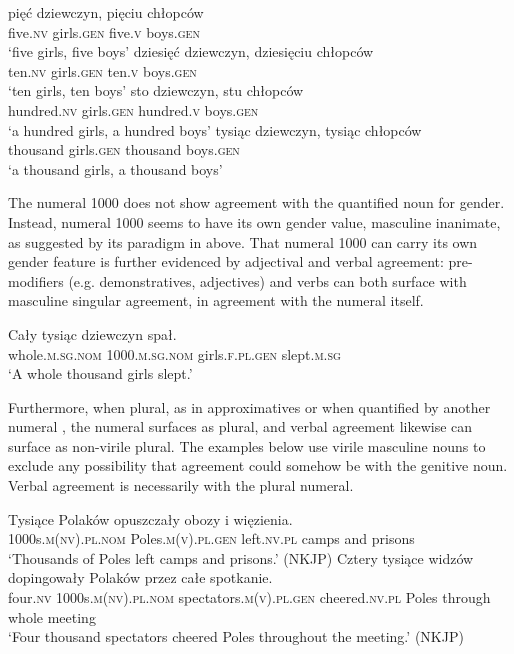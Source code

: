 \documentclass[output=paper]{langscibook}
\begin{document}
\ea \label{klo:ex:5,10,100,1000V.NV} \ea
\gll pięć dziewczyn, pięciu chłopców\\
five.\textsc{nv} girls.\textsc{gen} five.\textsc{v} boys.\textsc{gen}\\
\glt `five girls, five boys'
\ex \gll dziesięć dziewczyn, dziesięciu chłopców\\
ten.\textsc{nv} girls.\textsc{gen} ten.\textsc{v} boys.\textsc{gen}\\
\glt `ten girls, ten boys'
\ex \gll sto dziewczyn, stu chłopców\\
hundred.\textsc{nv} girls.\textsc{gen} hundred.\textsc{v} boys.\textsc{gen}\\
\glt `a hundred girls, a hundred boys'
\ex \gll tysiąc dziewczyn, tysiąc chłopców\\
thousand girls.\textsc{gen} thousand boys.\textsc{gen}\\
\glt `a thousand girls, a thousand boys'
\z \z %

\noindent The numeral 1000 does not show agreement with the quantified noun for gender. Instead, numeral 1000 seems to have its own gender value, masculine inanimate, as suggested by its paradigm in  above. That numeral 1000 can carry its own gender feature is further evidenced by adjectival and verbal agreement: pre-modifiers (e.g. demonstratives, adjectives) and verbs can both surface with masculine singular agreement, in agreement with the numeral itself.

\ea\label{klo:ex:sg1000}
\gll Cały tysiąc dziewczyn spał.\\
whole.\textsc{m.sg.nom} 1000.\textsc{m.sg.nom} girls.\textsc{f.pl.gen} slept.\textsc{m.sg}\\
\glt `A whole thousand girls slept.'
\z

\noindent Furthermore, when plural, as in approximatives  or when quantified by another numeral , the numeral surfaces as plural, and verbal agreement likewise can surface as non-virile plural. The examples below use virile masculine nouns to exclude any possibility that agreement could somehow be with the genitive noun. Verbal agreement is necessarily with the plural numeral.

\ea \label{klo:ex:plural1000}
\ea \label{klo:ex:approx1000}
\gll Tysiące Polaków opuszczały obozy i więzienia.\\
1000s.\textsc{m(nv).pl.nom} Poles.\textsc{m(v).pl.gen} left.\textsc{nv.pl} camps and prisons\\
\glt `Thousands of Poles left camps and prisons.' \hfill (NKJP)
\ex  \gll Cztery tysiące widzów dopingowały Polaków przez całe spotkanie. \\
four.\textsc{nv} 1000s.\textsc{m(nv).pl.nom} spectators.\textsc{m(v).pl.gen} cheered.\textsc{nv.pl} Poles through whole meeting\\
\glt `Four thousand spectators cheered Poles throughout the meeting.' \label{klo:ex:quant1000} \hfill (NKJP)
\z \z %
\end{document}
